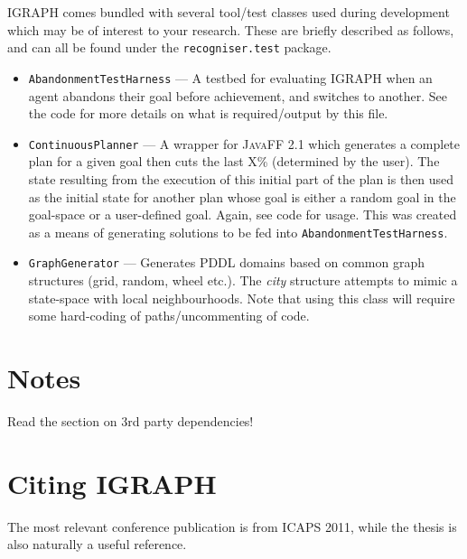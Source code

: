 \documentclass[10pt,a4paper]{article}
\begin{document}
\textsc{IGRAPH} comes bundled with several tool/test classes used during development which may be of interest to your research. These are briefly described as follows, and can all be found under the \texttt{recogniser.test} package.

\begin{itemize}

\item \texttt{AbandonmentTestHarness} --- A testbed for evaluating \textsc{IGRAPH} when an agent abandons their goal before achievement, and switches to another. See the code for more details on what is required/output by this file.

\item \texttt{ContinuousPlanner} --- A wrapper for \textsc{JavaFF} 2.1 which generates a complete plan for a given goal then cuts the last X\% (determined by the user). The state resulting from the execution of this initial part of the plan is then used as the initial state for another plan whose goal is either a random goal in the goal-space or a user-defined goal. Again, see code for usage. This was created as a means of generating solutions to be fed into \texttt{AbandonmentTestHarness}.

\item \texttt{GraphGenerator} --- Generates PDDL domains based on common graph structures (grid, random, wheel etc.). The \emph{city} structure attempts to mimic a state-space with local neighbourhoods. Note that using this class will require some hard-coding of paths/uncommenting of code.

\end{itemize}

\section{Notes}
Read the section on 3rd party dependencies!


\section{Citing \textsc{IGRAPH}}

The most relevant conference publication is from ICAPS 2011, while the thesis is also naturally a useful reference.
\end{document}
